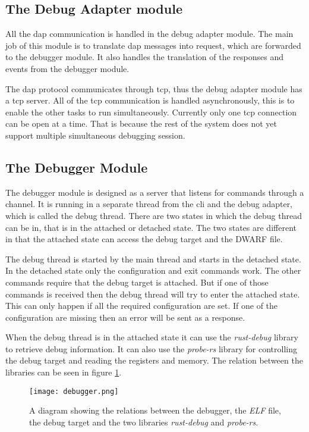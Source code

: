 \subsection{The Debug Adapter module}

All the \gls{dap} communication is handled in the debug adapter module.
The main job of this module is to translate \gls{dap} messages into request, which are forwarded to the debugger module.
It also handles the translation of the responses and events from the debugger module.


The \gls{dap} protocol communicates through \gls{tcp}, thus the debug adapter module has a \gls{tcp} server.
All of the \gls{tcp} communication is handled asynchronously, this is to enable the other tasks to run simultaneously.
Currently only one \gls{tcp} connection can be open at a time.
That is because the rest of the system does not yet support multiple simultaneous debugging session.



\subsection{The Debugger Module} %
The debugger module is designed as a server that listens for commands through a channel.
It is running in a separate thread from the \acrshort{cli} and the debug adapter, which is called the debug thread.
There are two states in which the debug thread can be in, that is in the attached or detached state.
The two states are different in that the attached state can access the debug target and the \gls{DWARF} file.


The debug thread is started by the main thread and starts in the detached state.
In the detached state only the configuration and exit commands work.
The other commands require that the debug target is attached.
But if one of those commands is received then the debug thread will try to enter the attached state.
This can only happen if all the required configuration are set.
If one of the configuration are missing then an error will be sent as a response.


When the debug thread is in the attached state it can use the \emph{rust-debug} library to retrieve debug information.
It can also use the \emph{probe-rs} library for controlling the debug target and reading the registers and memory.
The relation between the libraries can be seen in figure \ref{fig:debugger}.


\begin{figure}[h]
	\centering
	\texttt{[image: debugger.png]}
	\caption{A diagram showing the relations between the debugger, the \emph{ELF} file, the debug target and the two libraries \emph{rust-debug} and \emph{probe-rs}.}
	\label{fig:debugger}
\end{figure}


